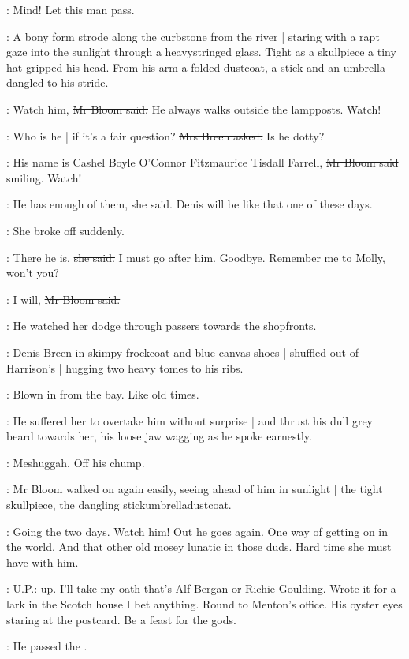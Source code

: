 \Bloom:
Mind!
Let this man pass.

:
A bony form strode along the curbstone from the river |
staring with a rapt gaze into the sunlight through a heavystringed glass.
Tight as a skullpiece a tiny hat gripped his head.
From his arm a folded dustcoat,
a stick and an umbrella dangled to his stride.

\Bloom:
Watch him,
\sout{Mr Bloom said.}
He always walks outside the lampposts.
Watch!%

\josie:
Who is he |
if it's a fair question?
\sout{Mrs Breen asked.}
Is he dotty?

\Bloom:
His name is Cashel Boyle O'Connor Fitzmaurice Tisdall Farrell,
\sout{Mr Bloom said smiling.}
Watch!

\josie:
He has enough of them,
\sout{she said.}
Denis will be like that one of these days.

:
She broke off suddenly.

\josie:
There he is,
\sout{she said.}
I must go after him.
Goodbye.
Remember me to Molly,
won't you?

\Bloom:
I will,
\sout{Mr Bloom said.}

:
He watched her dodge through passers towards the shopfronts.

:
Denis Breen in skimpy frockcoat and blue canvas shoes |
shuffled out of Harrison's |
hugging two heavy tomes to his ribs.

\BloomInt:
Blown in from the bay.
Like old times.

:
He suffered her to overtake him without surprise |
and thrust his dull grey beard towards her,
his loose jaw wagging as he spoke earnestly.

\BloomInt:
Meshuggah.
Off his chump.

:
Mr Bloom walked on again easily,
seeing ahead of him in sunlight |
the tight skullpiece,
the dangling stickumbrelladustcoat.

\BloomInt:
Going the two days.
Watch him!
Out he goes again.
One way of getting on in the world.
And that other old mosey lunatic in those duds.
Hard time she must have with him.

\BloomInt:
U.P.:
up.
I'll take my oath that's Alf Bergan or Richie Goulding.
Wrote it for a lark in the Scotch house I bet anything.
Round to Menton's office.
His oyster eyes staring at the postcard.
Be a feast for the gods.

:
He passed the .

